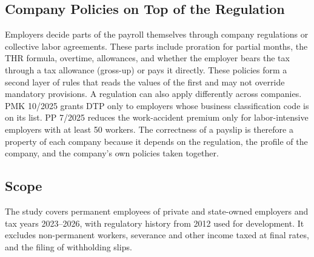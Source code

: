\subsection{Company Policies on Top of the Regulation}
\label{sec:policies}
Employers decide parts of the payroll themselves through company regulations or collective labor agreements. These parts include proration for partial months, the THR formula, overtime, allowances, and whether the employer bears the tax through a tax allowance (gross-up) or pays it directly. These policies form a second layer of rules that reads the values of the first and may not override mandatory provisions. A regulation can also apply differently across companies. PMK 10/2025 grants DTP only to employers whose business classification code is on its list. PP 7/2025 reduces the work-accident premium only for labor-intensive employers with at least 50 workers. The correctness of a payslip is therefore a property of each company because it depends on the regulation, the profile of the company, and the company's own policies taken together.

\subsection{Scope}
The study covers permanent employees of private and state-owned employers and tax years 2023--2026, with regulatory history from 2012 used for development. It excludes non-permanent workers, severance and other income taxed at final rates, and the filing of withholding slips.
